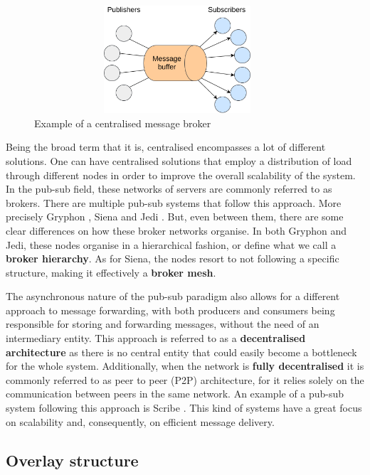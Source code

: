 \begin{figure}[hb!]
  \centering
  \includegraphics[max height=4cm,max width=0.95\textwidth]{img/centralised-topology.png}
  \caption{Example of a centralised message broker}
  \label{fig:centralised-topology}
\end{figure}

Being the broad term that it is, centralised encompasses a lot of different solutions.
One can have centralised solutions that employ a distribution of load through
different nodes in order to improve the overall scalability of the system. In the pub-sub field, these networks
of servers are commonly referred to as brokers. There are multiple pub-sub systems
that follow this approach. More precisely Gryphon \cite{Strom1998}, Siena \cite{Carzaniga2003}
and Jedi \cite{Cugola2001}. But, even between them, there are some clear differences
on how these broker networks organise. In both Gryphon and Jedi, these nodes organise in
a hierarchical fashion, or define what we call a \textbf{broker hierarchy}. As for Siena,
the nodes resort to not following a specific structure, making it effectively a \textbf{broker mesh}.

The asynchronous nature of the pub-sub paradigm also allows for a
different approach to message forwarding, with both producers and
consumers being responsible for storing and forwarding messages, without
the need of an intermediary entity. This approach is referred to as a
\textbf{decentralised architecture} as there is no central entity that could easily
become a bottleneck for the whole system. Additionally, when the network is
\textbf{fully decentralised} it is commonly referred to as peer to peer (P2P) architecture,
for it relies solely on the communication between peers in the same network.
An example of a pub-sub system following this approach is Scribe \cite{Castro2002}.
This kind of systems have a great focus on scalability and, consequently, on efficient message delivery.

\subsection{Overlay structure}\label{overlay-structure}

